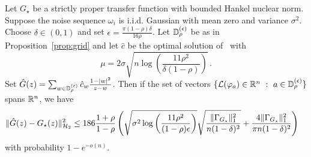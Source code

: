 \begin{theorem}\label{thm:estimation}  Let $G_\star$ be a strictly proper transfer function with bounded Hankel nuclear norm. Suppose the noise sequence $\omega_i$ is i.i.d. Gaussian with mean zero and variance $\sigma^2$.  Choose $\delta \in (0,1)$ and set $\epsilon = \frac{\pi (1-\rho)\delta}{16 \rho}$.  Let $\mathbb{D}_\rho^{(\epsilon)}$ be as in Proposition~\ref{prop:grid} and let $\hat{c}$ be the optimal solution of~ with 
\[
\mu=2\sigma \sqrt{ n \log \left(\frac{11 \rho^2}{\delta(1-\rho)} \right)}\,.
\]
Set $\hat{G}(z) = \sum_{w \in \mathbb{D}_{\rho}^{(\epsilon)}} \hat{c}_w \frac{1-|w|^2}{z-w}$.  Then if the set of vectors $\{\mathcal{L}(\varphi_a)\in \mathbb{R}^n~:~a\in\mathbb{D}_{\rho}^{(\epsilon)}\}$ spans $\mathbb{R}^n$, we have 
\[
\begin{aligned}
	&\|\hat{G}(z)-G_{\star}(z)\|_{\mathcal{H}_2}^2 \leq  
	186 \frac{1+\rho}{1-\rho} \left( \sqrt{\sigma^2 \log\left(\frac{11 \rho^2}{(1-\rho)\epsilon}\right)}\sqrt{\frac{\|\Gamma_{G_\star}\|_{1}^2}{n(1-\delta)^2} } + \frac{4\|\Gamma_{G_\star}\|_{1}^2}{\pi n(1-\delta)^2}   \right)
	\end{aligned}
\]
with probability $1-e^{-o(n)}$.
\end{theorem}
